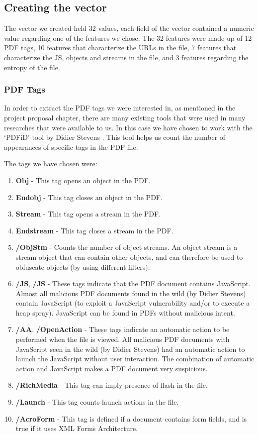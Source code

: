 \documentclass{article}
\begin{document}
\subsection{Creating the vector}
\indent	The vector we created held 32 values, each field of the vector contained a numeric value regarding one of the features we chose. The 32 features were made up of 12 PDF tags, 10 features that characterize the URLs in the file, 7 features that characterize the JS, objects and streams in the file, and 3 features regarding the entropy of the file.

\subsubsection{PDF Tags}
\indent	In order to extract the PDF tags we were interested in, as mentioned in the project proposal chapter, there are many existing tools that were used in many researches that were available to us. In this case we have chosen to work with the ‘PDFiD’ tool by Didier Stevens \cite{1}. This tool helps us count the number of appearances of specific tags in the PDF file. 

\indent The tags we have chosen were:

\begin{enumerate}
	\item \textbf{Obj} - This tag opens an object in the PDF.
	\item \textbf{Endobj} - This tag closes an object in the PDF.
	\item \textbf{Stream} - This tag opens a stream in the PDF.
	\item \textbf{Endstream} - This tag closes a stream in the PDF.
	\item \textbf{/ObjStm} - Counts the number of object streams. An object stream is a stream object that can contain other objects, and can therefore be used to obfuscate objects (by using different filters).
	\item \textbf{/JS}, \textbf{/JS} - These tags indicate that the PDF document contains JavaScript. Almost all malicious PDF documents found in the wild (by Didier Stevens) contain JavaScript (to exploit a JavaScript vulnerability and/or to execute a heap spray). JavaScript can be found in PDFs without malicious intent.
	\item \textbf{/AA}, \textbf{/OpenAction} - These tags indicate an automatic action to be performed when the file is viewed. All malicious PDF documents with JavaScript seen in the wild (by Didier Stevens) had an automatic action to launch the JavaScript without user interaction. The combination of automatic action and JavaScript makes a PDF document very suspicious.
	\item \textbf{/RichMedia} - This tag can imply presence of flash in the file.
	\item \textbf{/Launch} - This tag counts launch actions in the file.
	\item \textbf{/AcroForm} - This tag is defined if a document contains form fields, and is true if it uses XML Forms Architecture.
\end{enumerate}
\end{document}
